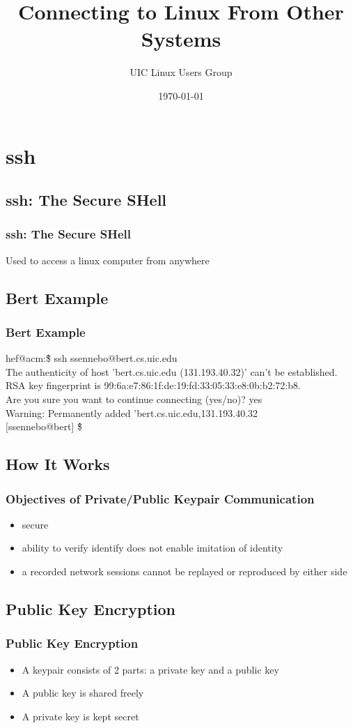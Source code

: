 \documentclass[hyperref={pdfpagelabels=false}]{beamer}
\title{Connecting to Linux From Other Systems}
\author{UIC Linux Users Group}
\date{\today}
\begin{document}
\frame{\titlepage}
\section{ssh}
\subsection{ssh: The Secure SHell}
\frame
{
  \frametitle{ssh: The Secure SHell}
  Used to access a linux computer from anywhere
}
\subsection{Bert Example}
\frame
{
  \frametitle{Bert Example}
  hef@acm:\~\$ ssh ssennebo@bert.cs.uic.edu\\
  The authenticity of host 'bert.cs.uic.edu (131.193.40.32)' can't be established.\\
  RSA key fingerprint is 99:6a:e7:86:1f:de:19:fd:33:05:33:e8:0b:b2:72:b8.\\
  Are you sure you want to continue connecting (yes/no)? yes\\
  Warning: Permanently added 'bert.cs.uic.edu,131.193.40.32\\
  $[$ssennebo@bert$]$ \~\$
}
\subsection{How It Works}
\frame
{
  \frametitle{Objectives of Private/Public Keypair Communication}
  \begin{itemize}
  \item{secure}
  \item{ability to verify identify does not enable imitation of identity}
  \item{a recorded network sessions cannot be replayed or reproduced by either side}
  \end{itemize}
}
\subsection{Public Key Encryption}
\frame
{
    \frametitle{Public Key Encryption}
    \begin{itemize}
    \item{A keypair consists of 2 parts: a private key and a public key}
    \item{A public key is shared freely}
    \item{A private key is kept secret}
    \end{itemize}
}
\end{document}
